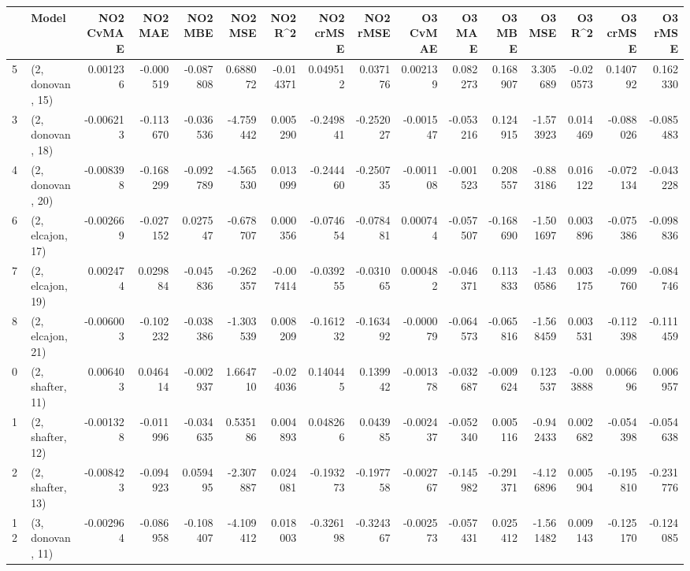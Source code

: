 \begin{tabular}{llrrrrrrrrrrrrrr}
\toprule
{} &             Model &  NO2 CvMAE &   NO2 MAE &   NO2 MBE &    NO2 MSE &   NO2 R\textasciicircum2 &  NO2 crMSE &  NO2 rMSE &  O3 CvMAE &    O3 MAE &    O3 MBE &     O3 MSE &    O3 R\textasciicircum2 &  O3 crMSE &   O3 rMSE \\
\midrule
5  &  (2, donovan, 15) &   0.001236 & -0.000519 & -0.087808 &   0.688072 & -0.014371 &   0.049512 &  0.037176 &  0.002139 &  0.082273 &  0.168907 &   3.305689 & -0.020573 &  0.140792 &  0.162330 \\
3  &  (2, donovan, 18) &  -0.006213 & -0.113670 & -0.036536 &  -4.759442 &  0.005290 &  -0.249841 & -0.252027 & -0.001547 & -0.053216 &  0.124915 &  -1.573923 &  0.014469 & -0.088026 & -0.085483 \\
4  &  (2, donovan, 20) &  -0.008398 & -0.168299 & -0.092789 &  -4.565530 &  0.013099 &  -0.244460 & -0.250735 & -0.001108 & -0.001523 &  0.208557 &  -0.883186 &  0.016122 & -0.072134 & -0.043228 \\
6  &  (2, elcajon, 17) &  -0.002669 & -0.027152 &  0.027547 &  -0.678707 &  0.000356 &  -0.074654 & -0.078481 &  0.000744 & -0.057507 & -0.168690 &  -1.501697 &  0.003896 & -0.075386 & -0.098836 \\
7  &  (2, elcajon, 19) &   0.002474 &  0.029884 & -0.045836 &  -0.262357 & -0.007414 &  -0.039255 & -0.031065 &  0.000482 & -0.046371 &  0.113833 &  -1.430586 &  0.003175 & -0.099760 & -0.084746 \\
8  &  (2, elcajon, 21) &  -0.006003 & -0.102232 & -0.038386 &  -1.303539 &  0.008209 &  -0.161232 & -0.163492 & -0.000079 & -0.064573 & -0.065816 &  -1.568459 &  0.003531 & -0.112398 & -0.111459 \\
0  &  (2, shafter, 11) &   0.006403 &  0.046414 & -0.002937 &   1.664710 & -0.024036 &   0.140445 &  0.139942 & -0.001378 & -0.032687 & -0.009624 &   0.123537 & -0.003888 &  0.006696 &  0.006957 \\
1  &  (2, shafter, 12) &  -0.001328 & -0.011996 & -0.034635 &   0.535186 &  0.004893 &   0.048266 &  0.043985 & -0.002437 & -0.052340 &  0.005116 &  -0.942433 &  0.002682 & -0.054398 & -0.054638 \\
2  &  (2, shafter, 13) &  -0.008423 & -0.094923 &  0.059495 &  -2.307887 &  0.024081 &  -0.193273 & -0.197758 & -0.002767 & -0.145982 & -0.291371 &  -4.126896 &  0.005904 & -0.195810 & -0.231776 \\
12 &  (3, donovan, 11) &  -0.002964 & -0.086958 & -0.108407 &  -4.109412 &  0.018003 &  -0.326198 & -0.324367 & -0.002573 & -0.057431 &  0.025412 &  -1.561482 &  0.009143 & -0.125170 & -0.124085 \\

\end{tabular}
